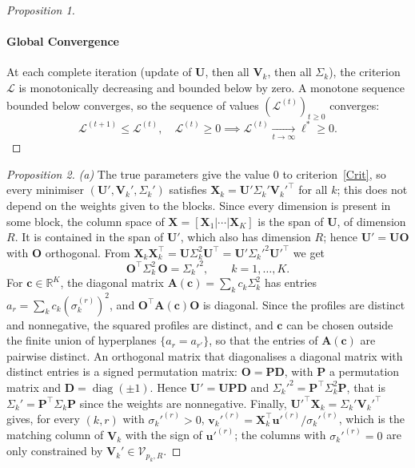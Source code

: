 \documentclass[11pt]{article}
\DeclareMathOperator{\diag}{diag}
\newcommand{\X}{\mathbf{X}}
\newcommand{\U}{\mathbf{U}}
\newcommand{\V}{\mathbf{V}}
\newcommand{\uu}{\mathbf{u}}
\newcommand{\vv}{\mathbf{v}}
\newcommand{\Stiefel}[2]{\mathcal V_{#1,#2}}
\begin{document}
\begin{proof}[Proposition 1]
\paragraph{Global Convergence} At each complete iteration (update of $\U$, then all $\V_k$, then all $\Sigma_k$), the criterion $\mathcal{L}$ is monotonically decreasing and bounded below by zero. A monotone sequence bounded below converges, so the sequence of values $(\mathcal{L}^{(t)})_{t \geq 0}$
converges:
\[
  \mathcal{L}^{(t+1)} \leq \mathcal{L}^{(t)}, \quad \mathcal{L}^{(t)} \geq 0
  \implies
  \mathcal{L}^{(t)} \xrightarrow[t \to \infty]{} \ell^* \geq 0.
\]
\end{proof}

\begin{proof}[Proposition 2]
\emph{(a)} The true parameters give the value $0$ to criterion~\eqref{Crit}, so
every minimiser $(\U',\V_k',\Sigma_k')$ satisfies
$\X_k=\U'\Sigma_k'\V_k'^\intercal$ for all $k$; this does not depend on the
weights given to the blocks. Since every dimension is present in some block,
the column space of $\X=[\X_1|\cdots|\X_K]$ is the span of $\U$, of dimension
$R$. It is contained in the span of $\U'$, which also has dimension $R$; hence
$\U'=\U\mathbf O$ with $\mathbf O$ orthogonal. From
$\X_k\X_k^\intercal=\U\Sigma_k^2\U^\intercal=\U'\Sigma_k'^2\U'^\intercal$ we get
\[
  \mathbf O^\intercal\Sigma_k^2\,\mathbf O=\Sigma_k'^2,\qquad k=1,\ldots,K .
\]
For $\mathbf c\in\mathbb R^K$, the diagonal matrix
$\mathbf A(\mathbf c)=\sum_k c_k\Sigma_k^2$ has entries
$a_r=\sum_k c_k(\sigma_k^{(r)})^2$, and $\mathbf O^\intercal\mathbf A(\mathbf c)\mathbf O$
is diagonal. Since the profiles are distinct and nonnegative, the squared
profiles are distinct, and $\mathbf c$ can be chosen outside the finite union
of hyperplanes $\{a_r=a_{r'}\}$, so that the entries of $\mathbf A(\mathbf c)$
are pairwise distinct. An orthogonal matrix that diagonalises a diagonal
matrix with distinct entries is a signed permutation matrix:
$\mathbf O=\mathbf P\mathbf D$, with $\mathbf P$ a permutation matrix and
$\mathbf D=\diag(\pm1)$. Hence $\U'=\U\mathbf P\mathbf D$ and
$\Sigma_k'^2=\mathbf P^\intercal\Sigma_k^2\mathbf P$, that is
$\Sigma_k'=\mathbf P^\intercal\Sigma_k\mathbf P$ since the weights are
nonnegative. Finally, $\U'^\intercal\X_k=\Sigma_k'\V_k'^\intercal$ gives, for
every $(k,r)$ with $\sigma_k'^{(r)}>0$,
$\vv_k'^{(r)}=\X_k^\intercal\uu'^{(r)}/\sigma_k'^{(r)}$, which is the matching
column of $\V_k$ with the sign of $\uu'^{(r)}$; the columns with
$\sigma_k'^{(r)}=0$ are only constrained by $\V_k'\in\Stiefel{p_k}{R}$.


\end{proof}
\end{document}
